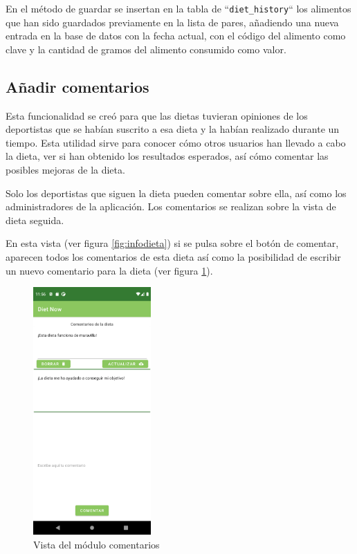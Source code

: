 En el método de guardar se insertan en la tabla de ``\texttt{diet\_history}`` los alimentos que han sido guardados previamente en la lista de pares, añadiendo una nueva entrada en la base de datos con la fecha actual, con el código del alimento como clave y la cantidad de gramos del alimento consumido como valor.

\subsection{Añadir comentarios}
Esta funcionalidad se creó para que las dietas tuvieran opiniones de los deportistas que se habían suscrito a esa dieta y la habían realizado durante un tiempo. Esta utilidad sirve para conocer cómo otros usuarios han llevado a cabo la dieta, ver si han obtenido los resultados esperados, así cómo comentar las posibles mejoras de la dieta.

Solo los deportistas que siguen la dieta pueden comentar sobre ella, así como los administradores de la aplicación. Los comentarios se realizan sobre la vista de dieta seguida.

En esta vista (ver figura \ref{fig:infodieta}) si se pulsa sobre el botón de comentar, aparecen todos los comentarios de esta dieta así como la posibilidad de escribir un nuevo comentario para la dieta (ver figura \ref{fig:comments}).

\begin{figure}[H]
    \centering
    \includegraphics[width=0.4\textwidth]{Images/Capitulo7/comments.png}
        \caption{Vista del módulo comentarios}
    \label{fig:comments}
\end{figure}

